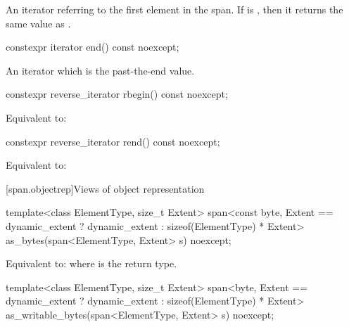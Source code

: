 \begin{itemdescr}
\pnum
\returns
An iterator referring to the first element in the span.
If  is , then it returns the
same value as .
\end{itemdescr}

%
\begin{itemdecl}
constexpr iterator end() const noexcept;
\end{itemdecl}

\begin{itemdescr}
\pnum
\returns
An iterator which is the past-the-end value.
\end{itemdescr}

%
\begin{itemdecl}
constexpr reverse_iterator rbegin() const noexcept;
\end{itemdecl}

\begin{itemdescr}
\pnum
\effects
Equivalent to: 
\end{itemdescr}

%
\begin{itemdecl}
constexpr reverse_iterator rend() const noexcept;
\end{itemdecl}

\begin{itemdescr}
\pnum
\effects
Equivalent to: 
\end{itemdescr}

[span.objectrep]{Views of object representation}

%
\begin{itemdecl}
template<class ElementType, size_t Extent>
  span<const byte, Extent == dynamic_extent ? dynamic_extent : sizeof(ElementType) * Extent>
    as_bytes(span<ElementType, Extent> s) noexcept;
\end{itemdecl}

\begin{itemdescr}
\pnum
\effects
Equivalent to: 
where  is the return type.
\end{itemdescr}

%
\begin{itemdecl}
template<class ElementType, size_t Extent>
  span<byte, Extent == dynamic_extent ? dynamic_extent : sizeof(ElementType) * Extent>
    as_writable_bytes(span<ElementType, Extent> s) noexcept;
\end{itemdecl}

